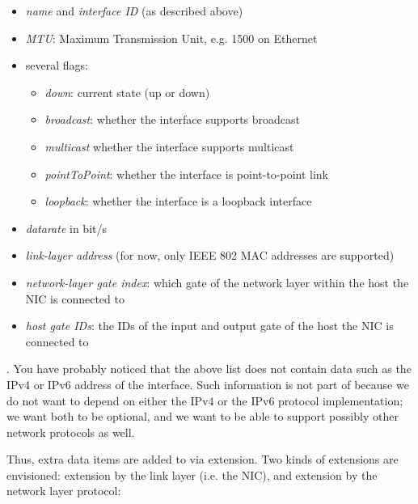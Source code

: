 \begin{itemize}
  \item \textit{name} and \textit{interface ID} (as described above)
  \item \textit{MTU}: Maximum Transmission Unit, e.g. 1500 on Ethernet
  \item several flags:
    \begin{itemize}
      \item \textit{down}: current state (up or down)
      \item \textit{broadcast}: whether the interface supports broadcast
      \item \textit{multicast} whether the interface supports multicast
      \item \textit{pointToPoint}: whether the interface is point-to-point link
      \item \textit{loopback}: whether the interface is a loopback interface
    \end{itemize}
  \item \textit{datarate} in bit/s
  \item \textit{link-layer address} (for now, only IEEE 802 MAC addresses are supported)
  \item \textit{network-layer gate index}: which gate of the network layer within the host the NIC is connected to
  \item \textit{host gate IDs}: the IDs of the input and output gate of the host the NIC is connected to
\end{itemize}

. You have probably noticed that the above list does not
contain data such as the IPv4 or IPv6 address of the interface. Such
information is not part of  because we do not want
 to depend on either the IPv4 or the IPv6 protocol
implementation; we want both to be optional, and we want
 to be able to support possibly other network
protocols as well.

Thus, extra data items are added to  via
extension. Two kinds of extensions are envisioned: extension by the link
layer (i.e. the NIC), and extension by the network layer protocol:

